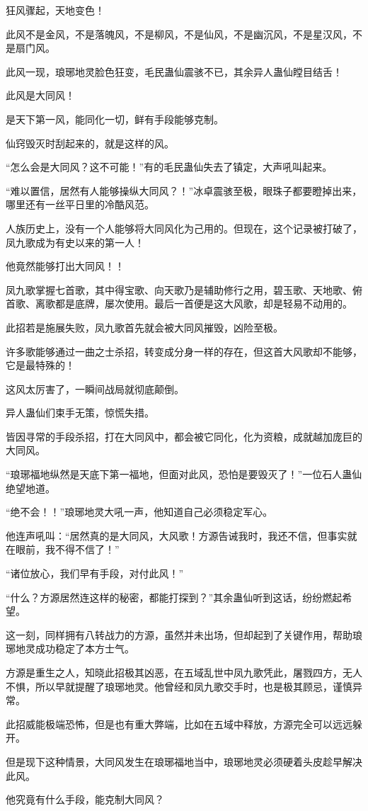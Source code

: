 \begin{this_body}
狂风骤起，天地变色！

此风不是金风，不是落魄风，不是柳风，不是仙风，不是幽沉风，不是星汉风，不是扇门风。

此风一现，琅琊地灵脸色狂变，毛民蛊仙震骇不已，其余异人蛊仙瞠目结舌！

此风是大同风！

是天下第一风，能同化一切，鲜有手段能够克制。

仙窍毁灭时刮起来的，就是这样的风。

“怎么会是大同风？这不可能！”有的毛民蛊仙失去了镇定，大声吼叫起来。

“难以置信，居然有人能够操纵大同风？！”冰卓震骇至极，眼珠子都要瞪掉出来，哪里还有一丝平日里的冷酷风范。

人族历史上，没有一个人能够将大同风化为己用的。但现在，这个记录被打破了，凤九歌成为有史以来的第一人！

他竟然能够打出大同风！！

凤九歌掌握七首歌，其中得宝歌、向天歌乃是辅助修行之用，碧玉歌、天地歌、俯首歌、离歌都是底牌，屡次使用。最后一首便是这大风歌，却是轻易不动用的。

此招若是施展失败，凤九歌首先就会被大同风摧毁，凶险至极。

许多歌能够通过一曲之士杀招，转变成分身一样的存在，但这首大风歌却不能够，它是最特殊的！

这风太厉害了，一瞬间战局就彻底颠倒。

异人蛊仙们束手无策，惊慌失措。

皆因寻常的手段杀招，打在大同风中，都会被它同化，化为资粮，成就越加庞巨的大同风。

“琅琊福地纵然是天底下第一福地，但面对此风，恐怕是要毁灭了！”一位石人蛊仙绝望地道。

“绝不会！！”琅琊地灵大吼一声，他知道自己必须稳定军心。

他连声吼叫：“居然真的是大同风，大风歌！方源告诫我时，我还不信，但事实就在眼前，我不得不信了！”

“诸位放心，我们早有手段，对付此风！”

“什么？方源居然连这样的秘密，都能打探到？”其余蛊仙听到这话，纷纷燃起希望。

这一刻，同样拥有八转战力的方源，虽然并未出场，但却起到了关键作用，帮助琅琊地灵成功稳定了本方士气。

方源是重生之人，知晓此招极其凶恶，在五域乱世中凤九歌凭此，屠戮四方，无人不惧，所以早就提醒了琅琊地灵。他曾经和凤九歌交手时，也是极其顾忌，谨慎异常。

此招威能极端恐怖，但是也有重大弊端，比如在五域中释放，方源完全可以远远躲开。

但是现下这种情景，大同风发生在琅琊福地当中，琅琊地灵必须硬着头皮趁早解决此风。

他究竟有什么手段，能克制大同风？

\end{this_body}

